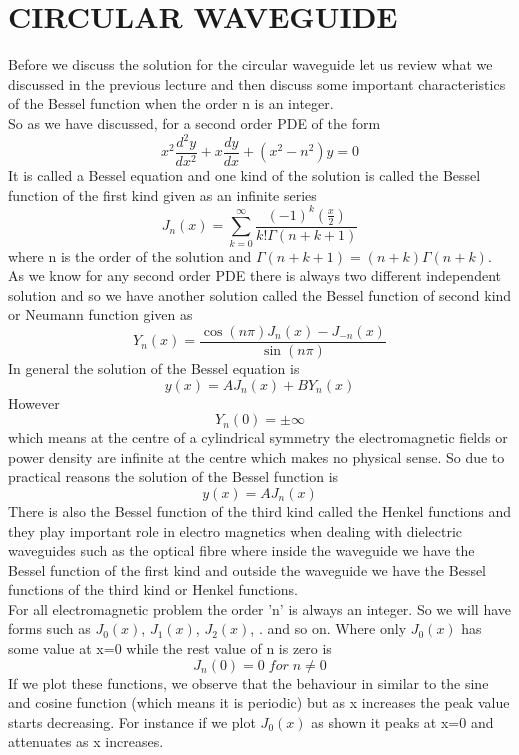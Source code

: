 \chapter[Circular Waveguide]{CIRCULAR WAVEGUIDE}
	Before we discuss the solution for the circular waveguide let us review what we discussed in the previous lecture and then discuss some important characteristics of the Bessel function when the order n is an integer.\\
	
	So as we have discussed, for a second order PDE of the form 
	 \begin{displaymath}
	 	x^2\frac{d^2y}{dx^2} + x\frac{dy}{dx} + (x^2-n^2)y {=} 0
	 \end{displaymath}
	 It is called a Bessel equation and one kind of the solution is called the Bessel function of the first kind given as an infinite series
	 \begin{displaymath}
	    J_n(x) {=} \sum^\infty_{k=0} \frac{(-1)^k (\frac{x}{2})}{k!\Gamma(n+k+1)}
	 \end{displaymath}
	 where n is the order of the solution and $\Gamma(n+k+1){=}(n+k)\Gamma(n+k)$. As we know for any second order PDE there is always two different independent solution and so we have another solution called the Bessel function of second kind or Neumann function given as 
	 \[Y_n(x) = \frac{\cos(n\pi)J_n(x)-J_{-n}(x)}{\sin(n\pi)} \]
	 In general the solution of the Bessel equation is \[y(x) = A J_n(x) + B Y_n(x)\]
	 However \[Y_n(0)=\pm\infty\] which means at the centre of a cylindrical symmetry the electromagnetic fields or power density are infinite at the centre which makes no physical sense. So due to practical reasons the solution of the Bessel function is 
	 \[y(x) = A J_n(x) \]
	 There is also the Bessel function of the third kind called the Henkel functions and they play important role in electro magnetics when dealing with dielectric waveguides such as the optical fibre where inside the waveguide we have the Bessel function of the first kind and outside the waveguide we have the Bessel functions of the third kind or Henkel functions.\\
	 
	 For all electromagnetic problem the order 'n' is always an integer. So we will have forms such as $ J_0(x) $, $ J_1(x) $, $ J_2(x) $, . and so on. Where only $J_0(x)$ has some value at x{=}0 while the rest value of n is zero is 
	 \[ J_n(0)=0 \; for \; n \neq 0 \]
	 If we plot these functions, we observe that the behaviour in similar to the sine and cosine function (which means it is periodic) but as x increases the peak value starts decreasing. For instance if we plot $J_0(x)$ as shown it peaks at x=0 and attenuates as x increases.
	 
